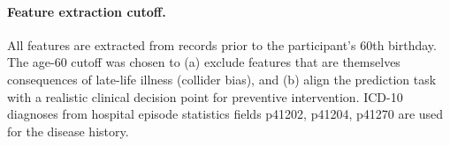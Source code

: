 \documentclass[runningheads]{llncs}
\begin{document}
\paragraph{Feature extraction cutoff.}
All features are extracted from records prior to the participant's 60th
birthday.
The age-60 cutoff was chosen to (a) exclude features that are themselves
consequences of late-life illness (collider bias), and (b) align the
prediction task with a realistic clinical decision point for preventive
intervention.
ICD-10 diagnoses from hospital episode statistics fields p41202, p41204,
p41270 are used for the disease history.
\end{document}
